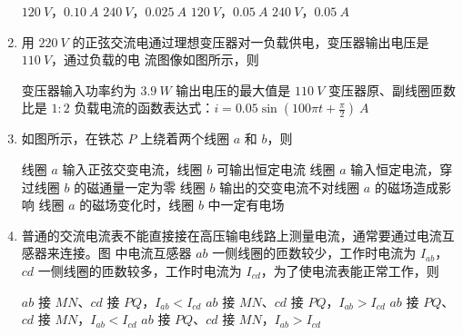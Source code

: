 \begin{enumerate}
\fourchoices
{$ 120 \ V $，$ 0.10 \ A $}
{$ 240 \ V $，$ 0.025 \ A $}
{$ 120 \ V $，$ 0.05 \ A $}
{$ 240 \ V $，$ 0.05 \ A $}


\item 
{}
用 $ 220 \ V $ 的正弦交流电通过理想变压器对一负载供电，变压器输出电压是 $ 110 \ V $，通过负载的电
流图像如图所示，则  
\begin{figure}[h!]
\centering

\end{figure}



\fourchoices
{变压器输入功率约为 $ 3.9 \ W $}
{输出电压的最大值是 $ 110 \ V $}
{变压器原、副线圈匝数比是 $ 1:2 $}
{负载电流的函数表达式：$i=0.05 \sin \left(100 \pi t+\frac{\pi}{2}\right) \ A$}



\item 
{}
如图所示，在铁芯 $ P $ 上绕着两个线圈 $ a $ 和 $ b $，则  
\begin{figure}[h!]
\centering

\end{figure}


\fourchoices
{线圈 $ a $ 输入正弦交变电流，线圈 $ b $ 可输出恒定电流}
{线圈 $ a $ 输入恒定电流，穿过线圈 $ b $ 的磁通量一定为零}
{线圈 $ b $ 输出的交变电流不对线圈 $ a $ 的磁场造成影响}
{线圈 $ a $ 的磁场变化时，线圈 $ b $ 中一定有电场}


\item 
{}
普通的交流电流表不能直接接在高压输电线路上测量电流，通常要通过电流互感器来连接。图
中电流互感器 $ ab $ 一侧线圈的匝数较少，工作时电流为 $ I_{ab} $，$ cd $ 一侧线圈的匝数较多，工作时电流为
$ I_{cd} $，为了使电流表能正常工作，则  
\begin{figure}[h!]
\centering
\begin{subfigure}{0.4\linewidth}
\centering
 
\caption{}\label{}
\end{subfigure}
\begin{subfigure}{0.4\linewidth}
\centering
 
\caption{}\label{}
\end{subfigure}
\end{figure}



\fourchoices
{$ ab $ 接 $ MN $、$ cd $ 接 $ PQ $，$ I_{ab} < I_{cd} $}
{$ ab $ 接 $ MN $、$ cd $ 接 $ PQ $，$ I_{ab} > I_{cd} $}
{$ ab $ 接 $ PQ $、$ cd $ 接 $ MN $，$ I_{ab} < I_{cd} $}
{$ ab $ 接 $ PQ $、$ cd $ 接 $ MN $，$ I_{ab} > I_{cd} $}



\end{enumerate}
